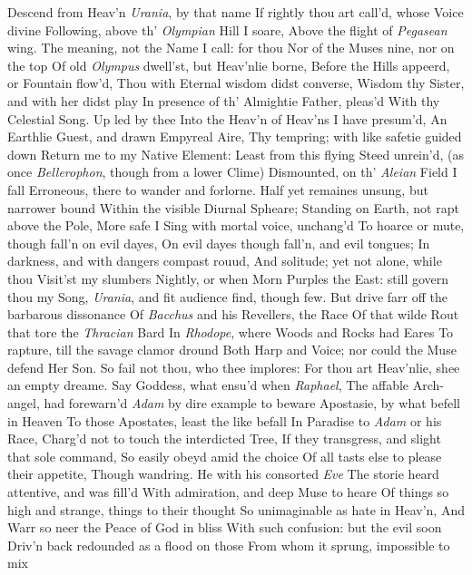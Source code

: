 \documentclass[11pt]{book}
\begin{document}
Descend from Heav'n \textit{Urania}, by that name 
If rightly thou art call'd, whose Voice divine 
Following, above th' \textit{Olympian} Hill I soare, 
Above the flight of \textit{Pegasean} wing. 
The meaning, not the Name I call: for thou 
Nor of the Muses nine, nor on the top 
Of old \textit{Olympus} dwell'st, but Heav'nlie borne, 
Before the Hills appeerd, or Fountain flow'd, 
Thou with Eternal wisdom didst converse, 
Wisdom thy Sister, and with her didst play 
In presence of th' Almightie Father, pleas'd 
With thy Celestial Song.  Up led by thee 
Into the Heav'n of Heav'ns I have presum'd, 
An Earthlie Guest, and drawn Empyreal Aire, 
Thy tempring; with like safetie guided down 
Return me to my Native Element: 
Least from this flying Steed unrein'd, (as once 
\textit{Bellerophon}, though from a lower Clime) 
Dismounted, on th' \textit{Aleian} Field I fall 
Erroneous, there to wander and forlorne. 
Half yet remaines unsung, but narrower bound 
Within the visible Diurnal Spheare; 
Standing on Earth, not rapt above the Pole, 
More safe I Sing with mortal voice, unchang'd 
To hoarce or mute, though fall'n on evil dayes, 
On evil dayes though fall'n, and evil tongues; 
In darkness, and with dangers compast rouud, 
And solitude; yet not alone, while thou 
Visit'st my slumbers Nightly, or when Morn 
Purples the East: still govern thou my Song, 
\textit{Urania}, and fit audience find, though few. 
But drive farr off the barbarous dissonance 
Of \textit{Bacchus} and his Revellers, the Race 
Of that wilde Rout that tore the \textit{Thracian} Bard 
In \textit{Rhodope}, where Woods and Rocks had Eares 
To rapture, till the savage clamor dround 
Both Harp and Voice; nor could the Muse defend 
Her Son.  So fail not thou, who thee implores: 
For thou art Heav'nlie, shee an empty dreame. 
\quad Say Goddess, what ensu'd when \textit{Raphael}, 
The affable Arch-angel, had forewarn'd 
\textit{Adam} by dire example to beware 
Apostasie, by what befell in Heaven 
To those Apostates, least the like befall 
In Paradise to \textit{Adam} or his Race, 
Charg'd not to touch the interdicted Tree, 
If they transgress, and slight that sole command, 
So easily obeyd amid the choice 
Of all tasts else to please their appetite, 
Though wandring.  He with his consorted \textit{Eve} 
The storie heard attentive, and was fill'd 
With admiration, and deep Muse to heare 
Of things so high and strange, things to their thought 
So unimaginable as hate in Heav'n, 
And Warr so neer the Peace of God in bliss 
With such confusion: but the evil soon 
Driv'n back redounded as a flood on those 
From whom it sprung, impossible to mix 
\end{document}
